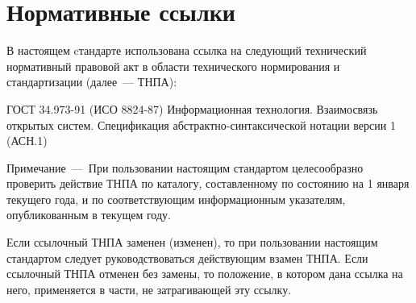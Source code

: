 \chapter{Нормативные ссылки}

В настоящем cтандарте использована ссылка на следующий технический нормативный 
правовой акт в области технического нормирования и стандартизации (далее~--- \mbox{ТНПА}):

ГОСТ 34.973-91 (ИСО 8824-87) Информационная технология. Взаимосвязь
открытых систем. Спецификация абстрактно-синтаксической нотации
версии 1 (АСН.1)

\begin{note}
Примечание~---~При пользовании настоящим стандартом целесообразно проверить
действие ТНПА по каталогу, составленному по
состоянию на 1 января текущего года, и по соответствующим информационным
указателям, опубликованным в текущем году.

Если ссылочный ТНПА заменен (изменен), то при пользовании настоящим стандартом
следует руководствоваться действующим взамен ТНПА. Если ссылочный ТНПА
отменен без замены, то положение, в котором дана ссылка на него, применяется в
части, не затрагивающей эту ссылку.
\end{note}
